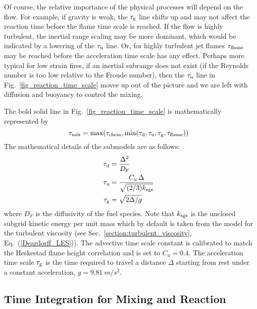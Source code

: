 Of course, the relative importance of the physical processes will depend on the flow.  For example, if gravity is weak, the $\tau_{\rm g}$ line shifts up and may not affect the reaction time before the flame time scale is reached.  If the flow is highly turbulent, the inertial range scaling may be more dominant, which would be indicated by a lowering of the $\tau_{\rm u}$ line.  Or, for highly turbulent jet flames $\tau_{\rm flame}$ may be reached before the acceleration time scale has any effect.  Perhaps more typical for low strain fires, if an inertial subrange does not exist (if the Reynolds number is too low relative to the Froude number), then the $\tau_{\rm u}$ line in Fig.~\ref{fig_reaction_time_scale} moves up out of the picture and we are left with diffusion and buoyancy to control the mixing.

The bold solid line in Fig.~\ref{fig_reaction_time_scale} is mathematically represented by
\begin{equation}
\label{eqn_tau_mix}
\tau_{\rm mix} = \max(\tau_{\rm chem},\min(\tau_{\rm d},\tau_{\rm u},\tau_{\rm g},\tau_{\rm flame}))
\end{equation}
The mathematical details of the submodels are as follows:
\begin{align}
\label{eq:tau_diff} \tau_{\rm d} &= \frac{\Delta^2}{D_{\si{F}}} \\
\label{eq:tau_sgs}  \tau_{\rm u} &= \frac{C_u \,\Delta}{\sqrt{(2/3)k_{\rm sgs}}} \\
\label{eqn_tau_grav}\tau_{\rm g} &= \sqrt{ 2\Delta/g }
\end{align}
where $D_{\si{F}}$ is the diffusivity of the fuel species. Note that $k_{\rm sgs}$ is the unclosed subgrid kinetic energy per unit mass which by default is taken from the model for the turbulent viscosity (see Sec.~\ref{section:turbulent_viscosity}, Eq.~(\ref{Deardorff_LES})).  The advective time scale constant is calibrated to match the Heskestad flame height correlation \cite{FDS_Validation_Guide} and is set to $C_u = 0.4$. The acceleration time scale $\tau_{\rm g}$ is the time required to travel a distance $\Delta$ starting from rest under a constant acceleration, $g=\SI{9.81}{m/s^2}$.



\subsection{Time Integration for Mixing and Reaction}
\label{sec:subgrid_evironment}

